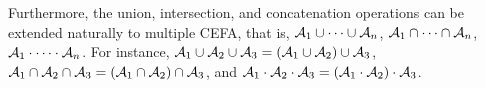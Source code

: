 Furthermore, the union, intersection, and concatenation operations can be extended naturally to multiple CEFA, that is, $\mathcal{A}_1 \cup \cdots \cup \mathcal{A}_n$, $\mathcal{A}_1 \cap \cdots \cap \mathcal{A}_n$, $\mathcal{A}_1 \cdot \cdots \cdot \mathcal{A}_n$. For instance, $\mathcal{A}_1 \cup \mathcal{A}_2 \cup \mathcal{A}_3 = (\mathcal{A}_1 \cup \mathcal{A}_2) \cup \mathcal{A}_3$, $\mathcal{A}_1 \cap \mathcal{A}_2 \cap \mathcal{A}_3 = (\mathcal{A}_1 \cap \mathcal{A}_2) \cap \mathcal{A}_3$, and $\mathcal{A}_1 \cdot \mathcal{A}_2 \cdot \mathcal{A}_3 = (\mathcal{A}_1 \cdot \mathcal{A}_2) \cdot \mathcal{A}_3$.




